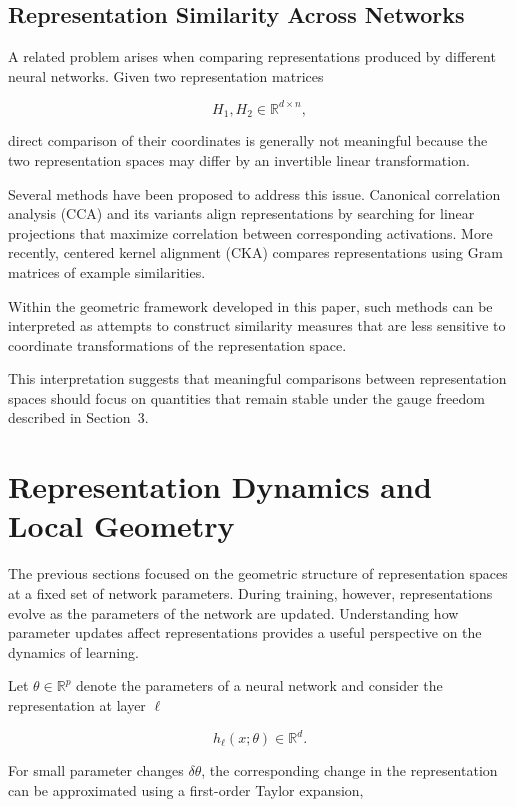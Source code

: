 \documentclass[11pt]{article}
\begin{document}
\subsection{Representation Similarity Across Networks}

A related problem arises when comparing representations produced by
different neural networks.
Given two representation matrices

\[
H_1 , H_2 \in \mathbb{R}^{d \times n},
\]

direct comparison of their coordinates is generally not meaningful
because the two representation spaces may differ by an invertible linear
transformation.

Several methods have been proposed to address this issue.
Canonical correlation analysis (CCA) and its variants align
representations by searching for linear projections that maximize
correlation between corresponding activations.
More recently, centered kernel alignment (CKA) compares representations
using Gram matrices of example similarities.

Within the geometric framework developed in this paper, such methods can
be interpreted as attempts to construct similarity measures that are less
sensitive to coordinate transformations of the representation space.

This interpretation suggests that meaningful comparisons between
representation spaces should focus on quantities that remain stable under
the gauge freedom described in Section~3.

\section{Representation Dynamics and Local Geometry}

The previous sections focused on the geometric structure of representation
spaces at a fixed set of network parameters.
During training, however, representations evolve as the parameters of the
network are updated.
Understanding how parameter updates affect representations provides a
useful perspective on the dynamics of learning.

Let $\theta \in \mathbb{R}^p$ denote the parameters of a neural network and
consider the representation at layer $\ell$

\[
h_\ell(x;\theta) \in \mathbb{R}^d .
\]

For small parameter changes $\delta \theta$, the corresponding change in the
representation can be approximated using a first-order Taylor expansion,
\end{document}
